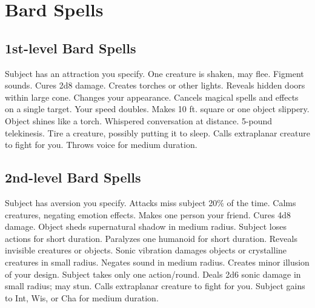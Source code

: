 \small

\section{Bard Spells}

\subsection{1st-level Bard Spells}
\begin{spelllist}
   Subject has an attraction you specify. 
   One creature is shaken, may flee.
   Figment sounds.
   Cures 2d8 damage.
   Creates torches or other lights.
   Reveals hidden doors within large cone.
   Changes your appearance.
   Cancels magical spells and effects on a single target.
   Your speed doubles.
   Makes 10 ft. square or one object slippery.
   Object shines like a torch.
   Whispered conversation at distance.
   5-pound telekinesis.
   Tire a creature, possibly putting it to sleep.
   Calls extraplanar creature to fight for you.
   Throws voice for medium duration.
\end{spelllist}

\subsection{2nd-level Bard Spells}
\begin{spelllist}
   Subject has aversion you specify.
   Attacks miss subject 20\% of the time.
   Calms creatures, negating emotion effects.
   Makes one person your friend. 
   Cures 4d8 damage.
   Object sheds supernatural shadow in medium radius.
   Subject loses actions for short duration.
   Paralyzes one humanoid for short duration.
   Reveals invisible creatures or objects.
   Sonic vibration damages objects or crystalline creatures in small radius.
   Negates sound in medium radius.
   Creates minor illusion of your design.
   Subject takes only one action/round.
   Deals 2d6 sonic damage in small radius; may stun.
   Calls extraplanar creature to fight for you.
   Subject gains  to Int, Wis, or Cha for medium duration.
\end{spelllist}

